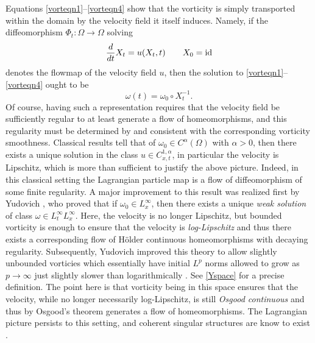 \documentclass[12pt]{article}
\begin{document}
Equations \eqref{vorteqn1}--\eqref{vorteqn4} show that the vorticity is simply transported within the domain by the velocity field it itself induces.  Namely, if the diffeomorphism $\Phi_t:\Omega \to \Omega$ solving
\begin{equation}	
\frac{d}{d t} X_t = u(X_t, t) \qquad X_0 = {\rm id}
\end{equation}
denotes the flowmap of the velocity field $u$, then   the solution to \eqref{vorteqn1}--\eqref{vorteqn4} ought to be 
\begin{equation}	
\omega(t) =  \omega_0 \circ X_t^{-1}.
\end{equation}
Of course, having such a representation requires that the velocity field be sufficiently regular to at least generate a flow of homeomorphisms, and this regularity must be determined by and consistent with the corresponding vorticity smoothness.  Classical results tell that of $\omega_0\in C^\alpha(\Omega)$ with $\alpha>0$, then there exists a unique solution in the class $u \in C^{1,\alpha}_{x,t}$, in particular the velocity is Lipschitz, which is more than sufficient to justify the above picture.  Indeed, in this classical setting the Lagrangian particle map is a flow of diffeomorphism of some finite regularity.  A major improvement to this result was realized first by Yudovich \cite{Yudovich1}, who proved that if $\omega_0\in L_x^\infty$, then there exists a unique \emph{weak solution} of class $\omega \in L^\infty_tL_x^\infty$.  Here, the velocity is no longer Lipschitz, but bounded vorticity is enough to ensure that the velocity is \emph{log-Lipschitz} and thus there exists a corresponding flow of H\"{o}lder continuous homeomorphisms with decaying regularity.  Subsequently, Yudovich improved this theory to allow slightly unbounded vorticies which essentially have initial $L^p$ norms allowed to grow as $p\to \infty$ just slightly slower than logarithmically \cite{Yudovich2}.  See \eqref{Yspace} for a precise definition.  The point here is that vorticity being in this space ensures that the velocity, while no longer necessarily log-Lipschitz, is still \emph{Osgood continuous} and thus by Osgood's  theorem generates a flow of homeomorphisms.   The Lagrangian picture persists to this setting, and coherent singular structures are know to exist \cite{DEL23}.
\end{document}
